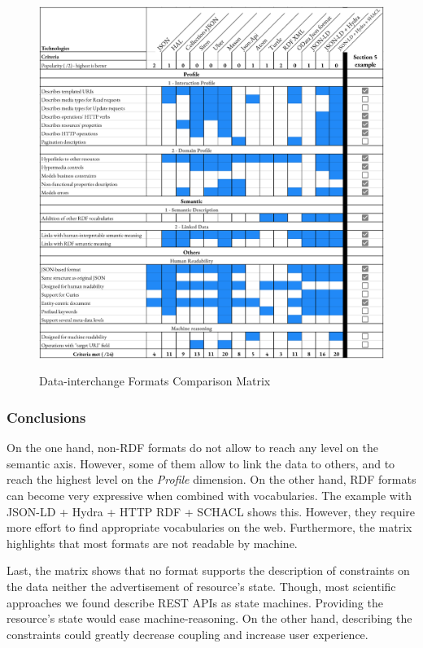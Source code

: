 \begin{figure}[ht]
\caption{Data-interchange Formats Comparison Matrix}
\includegraphics[width=1\textwidth]{figures/DIF.png}
\label{interchange-formats-matrix}
\end{figure}

\subsubsection*{Conclusions}

On the one hand, non-RDF formats do not allow to reach any level on the semantic axis. However, some of them allow to link the data to others, and to reach the highest level on the \textit{Profile} dimension.
On the other hand, RDF formats can become very expressive when combined with vocabularies. The example with JSON-LD + Hydra + HTTP RDF + SCHACL shows this. However, they require more effort to find appropriate vocabularies on the web.
Furthermore, the matrix highlights that most formats are not readable by machine.

Last, the matrix shows that no format supports the description of constraints on the data neither the advertisement of resource's state. Though, most scientific approaches we found describe REST APIs as state machines. Providing the resource's state would ease machine-reasoning. On the other hand, describing the constraints could greatly decrease coupling and increase user experience. %

